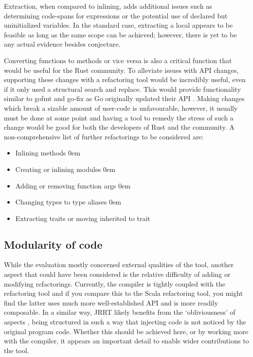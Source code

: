 Extraction, when compared to inlining, adds additional issues such as determining code-spans for expressions or the potential use of declared but uninitialized variables. In the standard case, extracting a local appears to be feasible as long as the same scope can be achieved; however, there is yet to be any actual evidence besides conjecture.

Converting functions to methods or vice versa is also a critical function that would be useful for the Rust community. To alleviate issues with API changes, supporting these changes with a refactoring tool would be incredibly useful, even if it only used a structural search and replace. This would provide functionality similar to gofmt and go-fix as Go originally updated their API \cite{gofix11}. Making changes which break a sizable amount of user-code is unfavourable, however, it usually must be done at some point and having a tool to remedy the stress of such a change would be good for both the developers of Rust and the community. A non-comprehensive list of further refactorings to be considered are:

\begin{multicols}{2}
\begin{itemize}
\item Inlining methods
\itemsep0em 
\item Creating or inlining modules
\itemsep0em 
\item Adding or removing function args
\itemsep0em 
\item Changing types to type aliases
\itemsep0em 
\item Extracting traits or moving inherited to trait
\end{itemize}
\end{multicols}



\subsection{Modularity of code}
While the evaluation mostly concerned external qualities of the tool, another aspect that could have been considered is the relative difficulty of adding or modifying refactorings. Currently, the compiler is tightly coupled with the refactoring tool and if you compare this to the Scala refactoring tool, you might find the latter uses much more well-established API and is more readily composable. In a similar way, JRRT likely benefits from the `obliviousness' of aspects \cite{aop}, being structured in such a way that injecting code is not noticed by the original program code. Whether this should be achieved here, or by working more with the compiler, it appears an important detail to enable wider contributions to the tool.


